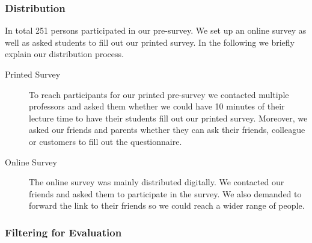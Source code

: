 \subsubsection{Distribution}
In total 251 persons participated in our pre-survey.
 We set up an online survey as well as asked students to fill out our printed survey.
 In the following we briefly explain our distribution process.


\begin{description}
	\item[Printed Survey] To reach participants for our printed pre-survey we contacted multiple professors and asked them whether we could have 10 minutes of their lecture time to have their students fill out our printed survey.
 Moreover, we asked our friends and parents whether they can ask their friends, colleague or customers to fill out the questionnaire.

	\item[Online Survey] The online survey was mainly distributed digitally.
 We contacted our friends and asked them to participate in the survey.
 We also demanded to forward the link to their friends so we could reach a wider range of people.

\end{description}

\subsubsection{Filtering for Evaluation}

